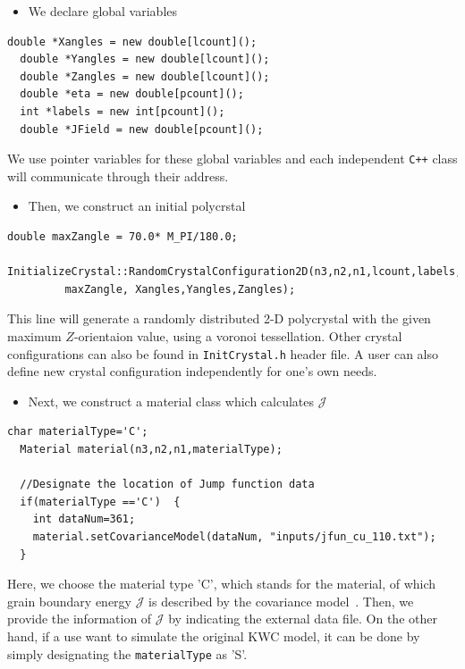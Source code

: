 \documentclass[11pt]{article}
\begin{document}
\begin{itemize} \item We declare global variables \end{itemize}

\begin{tcolorbox}
\begin{lstlisting}[basicstyle=\footnotesize]
  double *Xangles = new double[lcount]();
  double *Yangles = new double[lcount]();
  double *Zangles = new double[lcount]();
  double *eta = new double[pcount]();
  int *labels = new int[pcount]();
  double *JField = new double[pcount]();
\end{lstlisting}
\end{tcolorbox}

We use pointer variables for these global variables 
and each independent \texttt{C++} class 
will communicate through their address. 


\begin{itemize} \item Then, we construct an initial polycrstal \end{itemize}

\begin{tcolorbox}
\begin{lstlisting}[basicstyle=\footnotesize]
  double maxZangle = 70.0* M_PI/180.0;
  InitializeCrystal::RandomCrystalConfiguration2D(n3,n2,n1,lcount,labels, 
         maxZangle, Xangles,Yangles,Zangles);
\end{lstlisting}
\end{tcolorbox}

This line will generate a randomly distributed 2-D polycrystal 
with the given maximum $Z$-orientaion value, using a voronoi tessellation.
Other crystal configurations can also 
be found in \texttt{InitCrystal.h} header file.
A user can also define new crystal configuration 
independently for one's own needs.  

\begin{itemize} \item Next, we construct a material class which calculates $\mathcal{J}$ \end{itemize}
 
\begin{tcolorbox}
\begin{lstlisting}[basicstyle=\footnotesize]
  char materialType='C';
  Material material(n3,n2,n1,materialType);

  //Designate the location of Jump function data
  if(materialType =='C')  {
    int dataNum=361;
    material.setCovarianceModel(dataNum, "inputs/jfun_cu_110.txt");
  }
\end{lstlisting}
\end{tcolorbox}
Here, we choose the material type 'C', which stands for the material,
of which grain boundary energy $\mathcal{J}$ is described by the 
covariance model~\cite{Runnels:2016_1,Runnels:2016_2}.
Then, we provide the information of $\mathcal{J}$ by
indicating the external data file.
On the other hand, if a use want to simulate the original KWC model, 
it can be done by simply designating the \texttt{materialType} as 'S'.
\end{document}
